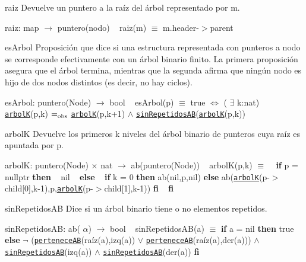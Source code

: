 \begin{DoxyParagraph}{raiz}
Devuelve un puntero a la raíz del árbol representado por m.

raiz\+: map $\to$ puntero(nodo) ~\newline
raiz(m) $\equiv$ m.\+header-\/$>$parent


\end{DoxyParagraph}
\begin{DoxyParagraph}{es\+Arbol}
Proposición que dice si una estructura representada con punteros a nodo se corresponde efectivamente con un árbol binario finito. La primera proposición asegura que el árbol termina, mientras que la segunda afirma que ningún nodo es hijo de dos nodos distintos (es decir, no hay ciclos).

es\+Arbol\+: puntero(\+Node) $\to$ bool ~\newline
es\+Arbol(p) $\equiv$ true $\Leftrightarrow$ ( $\exists$ k\+:nat) \href{axiomas.html#arbolK}{\tt arbolK}(p,k) $=_{\rm obs}$ \href{axiomas.html#arbolK}{\tt arbolK}(p,k+1) $\land$ \href{axiomas.html#sinRepetidosAB}{\tt sin\+Repetidos\+AB}(\href{axiomas.html#arbolK}{\tt arbolK}(p,k))


\end{DoxyParagraph}
\begin{DoxyParagraph}{arbolK}
Devuelve los primeros k niveles del árbol binario de punteros cuya raíz es apuntada por p.

arbolK\+: puntero(\+Node) $\times$ nat $\to$ ab(puntero(\+Node)) ~\newline
arbol\+K(p,k) $\equiv$ ~\newline
 {\bfseries if} p = nullptr {\bfseries then} ~\newline
 nil ~\newline
 {\bfseries else} ~\newline
{\bfseries if} k = 0 {\bfseries then} ab(nil,p,nil) {\bfseries else} ab(\href{axiomas.html#arbolK}{\tt arbolK}(p-\/$>$child\mbox{[}0\mbox{]},k-\/1),p,\href{axiomas.html#arbolK}{\tt arbolK}(p-\/$>$child\mbox{[}1\mbox{]},k-\/1)) {\bfseries fi} ~\newline
 {\bfseries fi} 


\end{DoxyParagraph}
\begin{DoxyParagraph}{sin\+Repetidos\+AB}
Dice si un árbol binario tiene o no elementos repetidos.

sin\+Repetidos\+AB\+: ab( $\alpha$) $\to$ bool ~\newline
sin\+Repetidos\+A\+B(a) $\equiv$ {\bfseries if} a = nil {\bfseries then} true {\bfseries else} $\lnot$ (\href{axiomas.html#perteneceAB}{\tt pertenece\+AB}(raíz(a),izq(a)) $\lor$ \href{axiomas.html#perteneceAB}{\tt pertenece\+AB}(raíz(a),der(a))) $\land$ \href{axiomas.html#sinRepetidosAB}{\tt sin\+Repetidos\+AB}(izq(a)) $\land$ \href{axiomas.html#sinRepetidosAB}{\tt sin\+Repetidos\+AB}(der(a)) {\bfseries fi} 


\end{DoxyParagraph}
